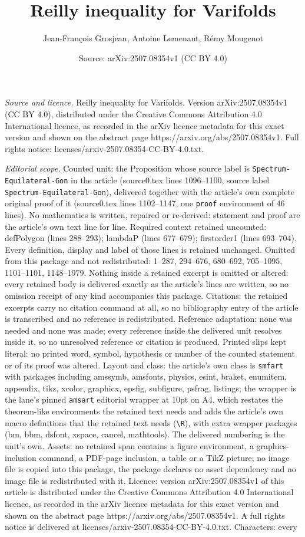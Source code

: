 \documentclass[10pt,a4paper]{amsart}
\title[Reilly inequality for Varifolds]{Reilly inequality for Varifolds}
\author{Jean-Fran\c{c}ois Grosjean, Antoine Lemenant, R\'emy Mougenot}
\date{Source: arXiv:2507.08354v1 (CC BY 4.0)}
\begin{document}
\maketitle

\noindent\emph{Source and licence.} Reilly inequality for Varifolds. Version arXiv:2507.08354v1 (CC BY 4.0), distributed under the Creative Commons Attribution 4.0 International licence, as recorded in the arXiv licence metadata for this exact version and shown on the abstract page https://arxiv.org/abs/2507.08354v1. Full rights notice: licenses/arxiv-2507.08354-CC-BY-4.0.txt.\par\smallskip

\noindent\textit{Editorial scope.} Counted unit: the Proposition whose source label is \texttt{Spectrum-Equilateral-Gon} in the article (source0.tex lines 1096--1100, source label \texttt{Spectrum-Equilateral-Gon}), delivered together with the article's own complete original proof of it (source0.tex lines 1102--1147, one \texttt{proof} environment of 46 lines). No mathematics is written, repaired or re-derived: statement and proof are the article's own text line for line. Required context retained uncounted: defPolygon (lines 288--293); lambdaP (lines 677--679); firstorder1 (lines 693--704). Every definition, display and label of those lines is retained unchanged. Omitted from this package and not redistributed: 1--287, 294--676, 680--692, 705--1095, 1101--1101, 1148--1979. Nothing inside a retained excerpt is omitted or altered: every retained body is delivered exactly as the article's lines are written, so no omission receipt of any kind accompanies this package. Citations: the retained excerpts carry no citation command at all, so no bibliography entry of the article is transcribed and no reference is redistributed. Reference adaptation: none was needed and none was made; every reference inside the delivered unit resolves inside it, so no unresolved reference or citation is produced. Printed slips kept literal: no printed word, symbol, hypothesis or number of the counted statement or of its proof was altered. Layout and class: the article's own class is \texttt{smfart} with packages including amssymb, amsfonts, physics, esint, braket, enumitem, appendix, tikz, xcolor, graphicx, epsfig, subfigure, psfrag, listings; the wrapper is the lane's pinned \texttt{amsart} editorial wrapper at 10pt on A4, which restates the theorem-like environments the retained text needs and adds the article's own macro definitions that the retained text needs (\texttt{\textbackslash R}), with extra wrapper packages (bm, bbm, dsfont, xspace, cancel, mathtools). The delivered numbering is the unit's own. Assets: no retained span contains a figure environment, a graphics-inclusion command, a PDF-page inclusion, a table or a TikZ picture; no image file is copied into this package, the package declares no asset dependency and no image file is redistributed with it. Licence: version arXiv:2507.08354v1 of this article is distributed under the Creative Commons Attribution 4.0 International licence, as recorded in the arXiv licence metadata for this exact version and shown on the abstract page https://arxiv.org/abs/2507.08354v1. A full rights notice is delivered at licenses/arxiv-2507.08354-CC-BY-4.0.txt. Characters: every 
\end{document}
